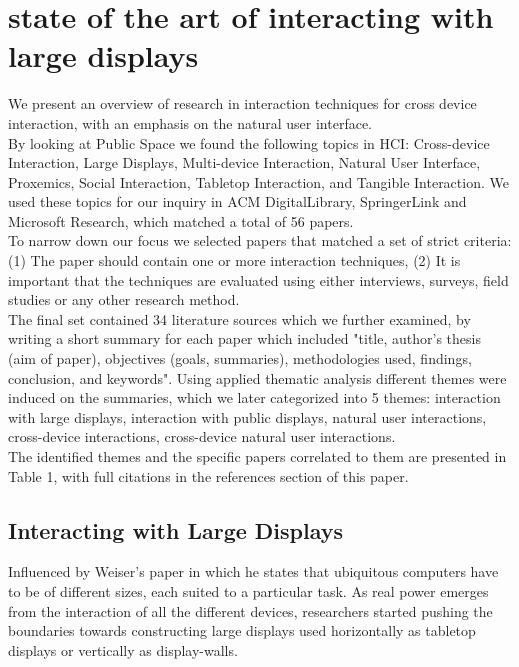 \section{state of the art of interacting with large displays}
We present an overview of research in interaction techniques for cross device interaction, with an emphasis on the natural user interface.\\

By looking at Public Space we found the following topics in HCI: Cross-device Interaction, Large Displays, Multi-device Interaction, Natural User Interface, Proxemics, Social Interaction, Tabletop Interaction, and Tangible Interaction. We used these topics for our inquiry in ACM DigitalLibrary, SpringerLink and Microsoft Research, which matched a total of 56 papers.\\
 
To narrow down our focus we selected papers that matched a set of strict criteria: (1) The paper should contain one or more interaction techniques, (2) It is important that the techniques are evaluated using either interviews, surveys, field studies or any other research method.\\
The final set contained 34 literature sources which we further examined, by writing a short summary for each paper which included "title, author's thesis (aim of paper), objectives (goals, summaries), methodologies used, findings, conclusion, and keywords". Using applied thematic analysis different themes were induced on the summaries, which we later categorized into 5 themes: interaction with large displays, interaction with public displays, natural user interactions, cross-device interactions, cross-device natural user interactions.\\

The identified themes and the specific papers correlated to them are presented in Table 1, with full citations in the references section of this paper. 

\subsection{Interacting with Large Displays}
Influenced by Weiser’s paper \cite{Weiser:1991} in which he states that ubiquitous computers have to be of different sizes, each suited to a particular task. As real power emerges from the interaction of all the different devices, researchers started pushing the boundaries towards constructing large displays used horizontally as tabletop displays or vertically as display-walls.\\
 
